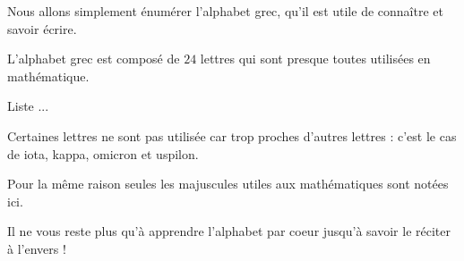 







\debuttexte

\diapo

Nous allons simplement énumérer l'alphabet grec,
qu'il est utile de connaître et savoir écrire.

\change

L'alphabet grec est composé de $24$ lettres qui sont 
presque toutes utilisées en mathématique.

Liste ...

Certaines lettres ne sont pas utilisée car trop proches
d'autres lettres : c'est le cas de iota, kappa, omicron et uspilon.

Pour la même raison seules les majuscules utiles aux mathématiques sont notées ici.



Il ne vous reste plus qu'à apprendre l'alphabet par coeur jusqu'à savoir le réciter à l'envers !


